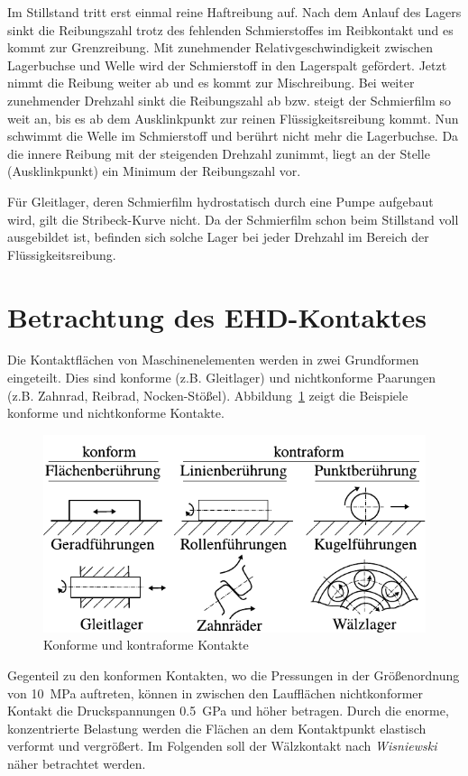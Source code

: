 Im Stillstand tritt erst einmal reine Haftreibung auf.
Nach dem Anlauf des Lagers sinkt die Reibungszahl trotz des fehlenden Schmierstoffes im Reibkontakt und es kommt zur Grenzreibung.
Mit zunehmender Relativgeschwindigkeit zwischen Lagerbuchse und Welle wird der Schmierstoff in den Lagerspalt gefördert.
Jetzt nimmt die Reibung weiter ab und es kommt zur Mischreibung.
Bei weiter zunehmender Drehzahl sinkt die Reibungszahl ab bzw. steigt der Schmierfilm so weit an, bis es ab dem Ausklinkpunkt zur reinen Flüssigkeitsreibung kommt.
Nun schwimmt die Welle im Schmierstoff und berührt nicht mehr die Lagerbuchse.
Da die innere Reibung mit der steigenden Drehzahl zunimmt, liegt an der Stelle (Ausklinkpunkt) ein Minimum der Reibungszahl vor.

Für Gleitlager, deren Schmierfilm hydrostatisch durch eine Pumpe aufgebaut wird, gilt die Stribeck-Kurve nicht.
Da der Schmierfilm schon beim Stillstand voll ausgebildet ist, befinden sich solche Lager bei jeder Drehzahl im Bereich der Flüssigkeitsreibung.

\section{Betrachtung des EHD-Kontaktes}
\label{sec:betrachtung_des_ehd_kontaktes}

Die Kontaktflächen von Maschinenelementen werden in zwei Grundformen eingeteilt.
Dies sind konforme (z.B. Gleitlager) und nichtkonforme Paarungen (z.B. Zahnrad, Reibrad, Nocken-Stößel).
Abbildung~\ref{fig:konforme_kontraforme_kontakte} zeigt die Beispiele konforme und nichtkonforme Kontakte.
\begin{figure}[htb]
    \centering
    \includegraphics[]{./images/konforme_kontraforme_kontakte.pdf}
    \caption{Konforme und kontraforme Kontakte \cite{steinhilper_2008}}
    \label{fig:konforme_kontraforme_kontakte}
\end{figure}
%
Gegenteil zu den konformen Kontakten, wo die Pressungen in der Größenordnung von \SI{10}{\mega\pascal} auftreten, können in zwischen den Laufflächen nichtkonformer Kontakt die Druckspannungen \SI{0.5}{\giga\pascal} und höher betragen.
Durch die enorme, konzentrierte Belastung werden die Flächen an dem Kontaktpunkt elastisch verformt und vergrößert.
Im Folgenden soll der Wälzkontakt nach \textit{Wisniewski} \cite{wisniewski} näher betrachtet werden.

